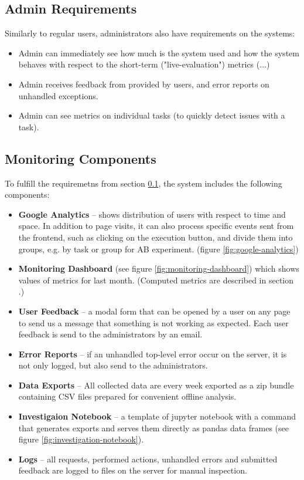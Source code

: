 \subsection{Admin Requirements}
\label{sec:admin-requirements}

Similarly to regular users, administrators also have requirements on the systems:

\begin{itemize}
\item Admin can immediately see how much is the system used and how the system behaves with respect to the short-term ("live-evaluation") metrics (...)
\item Admin receives feedback from provided by users, and error reports on unhandled exceptions.
\item Admin can see metrics on individual tasks (to quickly detect issues with a task).
\end{itemize}


\subsection{Monitoring Components}

To fulfill the requiremetns from section \ref{sec:admin-requirements},
the system includes the following components:

\begin{itemize}
\item \textbf{Google Analytics} --
  shows distribution of users with respect to time and space.
  In addition to page visits,
  it can also process specific events sent from the frontend,
  such as clicking on the execution button,
  and divide them into groups, e.g. by task or group for AB experiment.
  (figure \ref{fig:google-analytics})
\item \textbf{Monitoring Dashboard} (see figure \ref{fig:monitoring-dashboard})
      which shows values of metrics for last month.
      (Computed metrics are described in section \label{sec:robomission.metrics}.)
\item \textbf{User Feedback} --
  a modal form that can be opened by a user on any page
  to send us a message that something is not working as expected.
  Each user feedback is send to the administrators by an email.
\item \textbf{Error Reports} --
  if an unhandled top-level error occur on the server,
  it is not only logged, but also send to the administrators.
\item \textbf{Data Exports} --
  All collected data are every week exported as a zip bundle containing
  CSV files prepared for convenient offline analysis.
\item \textbf{Investigaion Notebook} --
  a template of jupyter notebook with a command that generates exports
  and serves them directly as pandas data frames
  (see figure \ref{fig:investigation-notebook}).
\item \textbf{Logs} --
  all requests, performed actions, unhandled errors and submitted feedback are logged
  to files on the server for manual inspection.
\end{itemize}


